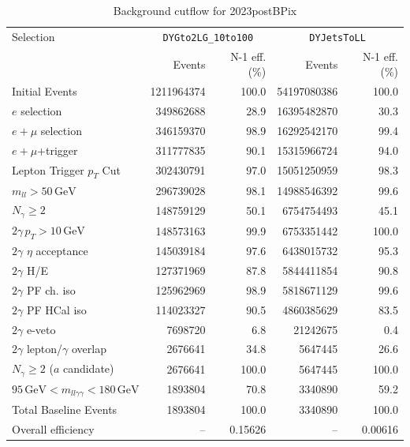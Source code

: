 \begin{table}[htbp]
\centering
\caption{Background cutflow for 2023postBPix}
\label{tab:cutflow-bkg-mc-2023postbpix}
\footnotesize
\begin{tabular}{lrrrr}
\hline
Selection & \multicolumn{2}{c}{\texttt{DYGto2LG\_10to100}} & \multicolumn{2}{c}{\texttt{DYJetsToLL}} \\
 & Events & N-1 eff. (\%) & Events & N-1 eff. (\%) \\
\hline
Initial Events & 1211964374 & 100.0 & 54197080386 & 100.0 \\
$e$ selection & 349862688 & 28.9 & 16395482870 & 30.3 \\
$e+\mu$ selection & 346159370 & 98.9 & 16292542170 & 99.4 \\
$e+\mu$+trigger & 311777835 & 90.1 & 15315966724 & 94.0 \\
Lepton Trigger $p_T$ Cut & 302430791 & 97.0 & 15051250959 & 98.3 \\
$m_{ll} > 50\,\mathrm{GeV}$ & 296739028 & 98.1 & 14988546392 & 99.6 \\
$N_{\gamma}\geq 2$ & 148759129 & 50.1 & 6754754493 & 45.1 \\
$2\gamma\,p_T > 10\,\mathrm{GeV}$ & 148573163 & 99.9 & 6753351442 & 100.0 \\
$2\gamma$ $\eta$ acceptance & 145039184 & 97.6 & 6438015732 & 95.3 \\
$2\gamma$ H/E & 127371969 & 87.8 & 5844411854 & 90.8 \\
$2\gamma$ PF ch. iso & 125962969 & 98.9 & 5818671129 & 99.6 \\
$2\gamma$ PF HCal iso & 114023327 & 90.5 & 4860385629 & 83.5 \\
$2\gamma$ e-veto & 7698720 & 6.8 & 21242675 & 0.4 \\
$2\gamma$ lepton/$\gamma$ overlap & 2676641 & 34.8 & 5647445 & 26.6 \\
$N_{\gamma}\geq 2$ ($a$ candidate) & 2676641 & 100.0 & 5647445 & 100.0 \\
$95\,\mathrm{GeV} < m_{ll\gamma\gamma} < 180\,\mathrm{GeV}$ & 1893804 & 70.8 & 3340890 & 59.2 \\
Total Baseline Events & 1893804 & 100.0 & 3340890 & 100.0 \\
\hline
Overall efficiency & -- & 0.15626 & -- & 0.00616 \\
\hline
\end{tabular}
\end{table}

